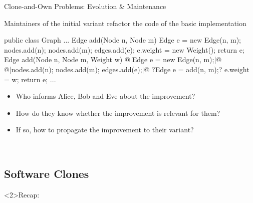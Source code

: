 \begin{frame}[fragile]{Clone-and-Own Problems: Evolution \& Maintenance}
	\begin{mycolumns}[b,widths={43}]
		\begin{example}{}
			Maintainers of the initial variant refactor the code of the basic implementation
		\end{example}
\begin{codetight}{}
public class Graph {
	...
	Edge add(Node n, Node m) {
		Edge e = new Edge(n, m);
		nodes.add(n); nodes.add(m); edges.add(e);
		e.weight = new Weight();
		return e;
	}
	Edge add(Node n, Node m, Weight w) {
		@|Edge e = new Edge(n, m);|@
		@|nodes.add(n); nodes.add(m); edges.add(e);|@
		?Edge e = add(n, m);?
		e.weight = w;
		return e;
	}
	...
}
\end{codetight} %
	\mynextcolumn
		\begin{note}{}
			\begin{itemize}
				\item Who informs Alice, Bob and Eve about the improvement?
				\item How do they know whether the improvement is relevant for them?
				\item If so, how to propagate the improvement to their variant?
			\end{itemize}
		\end{note}

		~

		\hfill
		\hfill
	\end{mycolumns}
\end{frame}

\subsection{Software Clones}

\begin{frame}<2>{Recap: \myframetitle\ \mytitlesource{\lectureintroduction}}
	\frameSoftwareClones
\end{frame}

